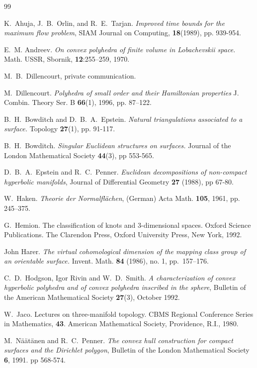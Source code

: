 \documentclass{acmart}
\begin{document}

\begin{thebibliography}{99}

K.~Ahuja,  J.~B.~Orlin, and R.~E.~Tarjan.
\textit{Improved time bounds for the maximum flow problem}, SIAM
Journal on Computing,
\textbf{18}(1989), pp. 939-954.

E.~M. Andreev.
\textit{On convex polyhedra of finite volume in Lobachevskii space.\/}
Math. USSR, Sbornik, \textbf{12}:255--259, 1970.

M.~B.~Dillencourt, private communication.

M.~Dillencourt. 
\textit{Polyhedra of small order and their Hamiltonian properties\/}
J. Combin. Theory Ser. B \textbf{66}(1), 1996, pp. 87--122.

B.~H.~Bowditch and D.~B.~A.~Epstein. 
\textit{Natural triangulations associated to a surface.\/}
Topology \textbf{27}(1), pp. 91-117.

B.~H.~Bowditch.
\textit{Singular Euclidean structures on surfaces.\/} Journal of the
London Mathematical Society \textbf{44}(3), pp 553-565.

D.~B.~A.~Epstein and R.~C.~Penner.
\textit{Euclidean decompositions of non-compact hyperbolic manifolds},
Journal of Differential Geometry \textbf{27} (1988), pp 67-80.

W.~Haken.
\textit{Theorie der Normalfl\"achen}, (German) Acta Math. \textbf{105}, 1961,
pp. 245--375.

G.~Hemion.
The classification of knots and $3$-dimensional spaces. Oxford
Science Publications. The Clarendon Press, Oxford University Press,
New York, 1992.

John Harer.
\textit{The virtual cohomological dimension of the mapping class group
  of an orientable surface.\/} 
Invent. Math. \textbf{84} (1986), no. 1, pp.~157--176. 

C.~D.~Hodgson, Igor Rivin and W.~D.~Smith.
\textit{A characterization of convex hyperbolic polyhedra and
of convex polyhedra inscribed in the sphere\/},
Bulletin of the American Mathematical Society \textbf{27}(3), October 1992. 

W.~Jaco. 
Lectures on three-manifold topology. CBMS Regional Conference Series in
Mathematics, \textbf{43}. American Mathematical Society, Providence,
R.I., 1980. 

M.~N\"a\"at\"anen and R.~C.~Penner.
\textit{The convex hull construction for compact surfaces and the
  Dirichlet polygon}, Bulletin of the London Mathematical Society
\textbf{6}, 1991. pp 568-574.


\end{thebibliography}
\end{document}
